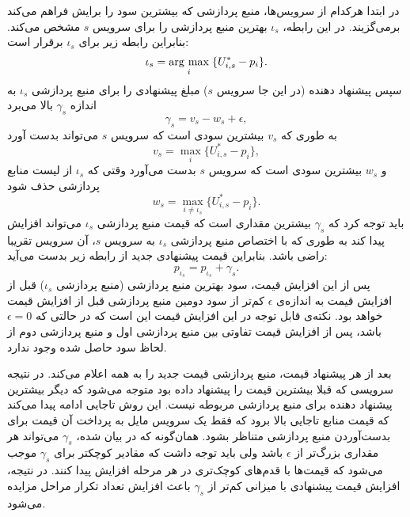       در ابتدا هرکدام از سرویس‌ها، منبع پردازشی که بیشترین سود را برایش فراهم می‌کند برمی‌گزیند.
      در این رابطه، $\iota_s$ بهترین منبع پردازشی را برای سرویس $s$ مشخص می‌کند.
      بنابراین رابطه زیر برای $\iota_s$ برقرار است:
      \begin{equation}\label{eqn:argmax_benefit}
        \iota_s = \underset{i}{\operatorname{arg}\,\operatorname{max}}\;\{U_{i,s}^* - p_i\}.
      \end{equation}
      سپس پیشنهاد دهنده (در این جا سرویس $s$) مبلغ پیشنهادی را برای منبع پردازشی $\iota_s$ به اندازه $\gamma_s$ بالا می‌برد
      \begin{equation}\label{eqn:bid_increase_1}
        \gamma_s = v_s - w_s + \epsilon,
      \end{equation}
      به طوری که $v_s$ بیشترین سودی است که سرویس $s$ می‌تواند بدست آورد
      \begin{equation}\label{eqn:bid_increase_2}
        v_s = \max_i\{U_{i,s}^* - p_i\},
      \end{equation}
      و $w_s$ بیشترین سودی است که سرویس $s$ بدست می‌آورد وقتی که $\iota_s$ از لیست منابع پردازشی حذف شود
      \begin{equation}\label{eqn:bid_increase_3}
        w_s = \max_{i \ne \iota_s}\{U_{i,s}^* - p_i\}.
      \end{equation}
      باید توجه کرد که $\gamma_s$ بیشترین مقداری است که قیمت منبع پردازشی $\iota_s$ می‌تواند افزایش پیدا کند به طوری که با اختصاص منبع پردازشی $\iota_s$ به سرویس $s$، آن سرویس تقریبا راضی باشد.
      بنابراین قیمت پیشنهادی جدید از رابطه زیر بدست می‌آید:
      \begin{equation}\label{eqn:bid_increase_4}
        p_{\iota_s} = p_{\iota_s} + \gamma_s.
      \end{equation}
      پس از این افزایش قیمت، سود بهترین منبع پردازشی (منبع پردازشی $\iota_s$) قبل از افزایش قیمت به اندازه‌ی $\epsilon$ کم‌تر از سود دومین منبع پردازشی قبل از افزایش قیمت خواهد بود.
      نکته‌ی قابل توجه در این افزایش قیمت این است که در حالتی که $\epsilon = 0$ باشد، پس از افزایش قیمت تفاوتی بین منبع پردازشی اول و منبع پردازشی دوم از لحاظ سود حاصل شده وجود ندارد.

      بعد از هر پیشنهاد قیمت، منبع پردازشی قیمت جدید را به همه اعلام می‌کند.
      در نتیجه سرویسی که قبلا بیشترین قیمت را پیشنهاد داده بود متوجه می‌شود که دیگر بیشترین پیشنهاد دهنده برای منبع پردازشی مربوطه نیست.
      این روش تاجایی ادامه پیدا می‌کند که قیمت منابع تاجایی بالا برود که فقط یک سرویس مایل به پرداخت آن قیمت برای بدست‌آوردن منبع پردازشی متناظر بشود.
      همان‌گونه که در \cite{auction_algorithms_bertsekas} بیان شده، $\gamma_s$ می‌تواند هر مقداری بزرگ‌تر از $\epsilon$ باشد ولی باید توجه داشت که مقادیر کوچکتر برای $\gamma_s$ موجب می‌شود که قیمت‌ها با قدم‌های کوچک‌تری در هر مرحله افزایش پیدا کنند.
      در نتیجه، افزایش قیمت پیشنهادی با میزانی کم‌تر از $\gamma_s$ باعث افزایش تعداد تکرار مراحل مزایده می‌شود.

